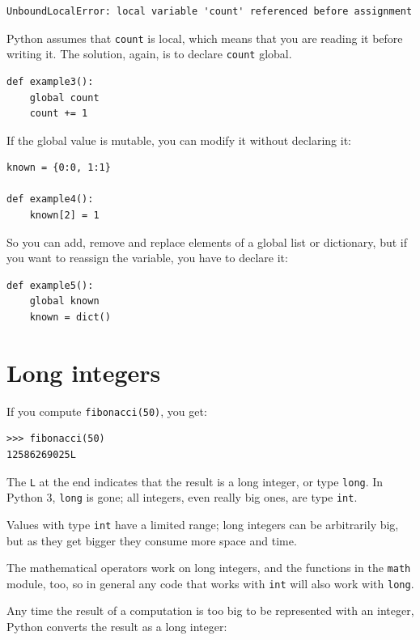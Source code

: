 \documentclass[10pt]{book}
\begin{document}
\begin{verbatim}
UnboundLocalError: local variable 'count' referenced before assignment
\end{verbatim}
%
Python assumes that {\tt count} is local, which means
that you are reading it before writing it.  The solution, again,
is to declare {\tt count} global.

\begin{verbatim}
def example3():
    global count
    count += 1
\end{verbatim}
%
If the global value is mutable, you can modify it without
declaring it:

\begin{verbatim}
known = {0:0, 1:1}

def example4():
    known[2] = 1
\end{verbatim}
%
So you can add, remove and replace elements of a global list or
dictionary, but if you want to reassign the variable, you
have to declare it:

\begin{verbatim}
def example5():
    global known
    known = dict()
\end{verbatim}
%

\section{Long integers}

If you compute {\tt fibonacci(50)}, you get:

\begin{verbatim}
>>> fibonacci(50)
12586269025L
\end{verbatim}
%
The {\tt L} at the end indicates that the result is a long
integer, or type {\tt long}.  In Python 3, {\tt long} is gone; all integers,
even really big ones, are type {\tt int}.

Values with type {\tt int} have a limited range;
long integers can be arbitrarily big, but as they get bigger
they consume more space and time.

The mathematical operators work on long integers, and the functions
in the {\tt math} module, too, so in general any code that
works with {\tt int} will also work with {\tt long}.

Any time the result of a computation is too big to be represented with
an integer, Python converts the result as a long integer:
\end{document}
